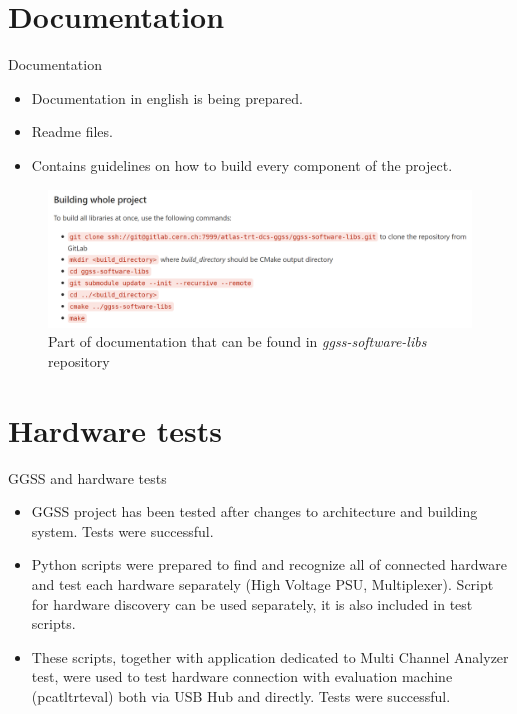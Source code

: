 \documentclass[10pt]{beamer}
\begin{document}
\section {Documentation}

\begin{frame}{Documentation}
\begin{itemize}
  \item Documentation in english is being prepared.
  \item Readme files.
  \item Contains guidelines on how to build every component of the project.
\end{itemize}
\begin{figure}
    \centering
    \includegraphics[width=\linewidth]{resources/documentation}
    \caption{Part of documentation that can be found in \textit{ggss-software-libs} repository}
\end{figure}
\end{frame}

\section {Hardware tests}

\begin{frame}{GGSS and hardware tests}
\begin{itemize}
	\item GGSS project has been tested after changes to architecture and building system. Tests were \color{darkgreen}successful\color{black}.
	\item Python scripts were prepared to find and recognize all of connected hardware and test each hardware separately (High Voltage PSU, Multiplexer). Script for hardware discovery can be used separately, it is also included in test scripts.
	\item These scripts, together with application dedicated to Multi Channel Analyzer test, were used to test hardware connection with evaluation machine (pcatltrteval) both via USB Hub and directly. Tests were \color{darkgreen}successful\color{black}.
\end{itemize}
\end{frame}
\end{document}
